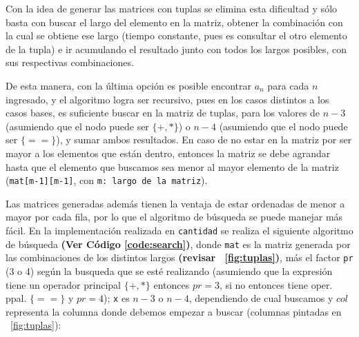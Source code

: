 \documentclass[letterpaper,10pt,table, dvipsnames]{article}
\newcommand{\figref}[1]{\figurename~\ref{#1}}
\begin{document}
\begin{enumerate}
\begin{table}[htbp]
\begin{minipage}[h]{0.8\linewidth}
\label{fig:matcombi4}
\end{minipage}
\end{table}

Con la idea de generar las matrices con tuplas se elimina esta dificultad y sólo basta con buscar el largo del elemento en la matriz, obtener la combinación con la cual se obtiene ese largo (tiempo constante, pues es consultar el otro elemento de la tupla) e ir acumulando el resultado junto con todos los largos posibles, con sus respectivas combinaciones. 
\end{enumerate}

De esta manera, con la última opción es posible encontrar $a_n$ para cada $n$ ingresado, y el algoritmo logra ser recursivo, pues en los casos distintos a los casos bases, es suficiente buscar en la matriz de tuplas, para los valores de $n-3$ (asumiendo que el nodo puede ser $\{+,*\}$) o $n-4$ (asumiendo que el nodo puede ser $\{==\}$), y sumar ambos resultados. En caso de no estar en la matriz por ser mayor a los elementos que están dentro, entonces la matriz se debe agrandar hasta que el elemento que buscamos sea menor al mayor elemento de la matriz (\texttt{mat[m-1][m-1]}, con \texttt{m: largo de la matriz}). 

Las matrices generadas además tienen la ventaja de estar ordenadas de menor a mayor por cada fila, por lo que el algoritmo de búsqueda se puede manejar más fácil. En la implementación realizada en \texttt{cantidad} se realiza el siguiente algoritmo de búsqueda \textbf{(Ver Código \ref{code:search})}, donde \texttt{mat} es la matriz generada por las combinaciones de los distintos largos \textbf{(revisar \figref{fig:tuplas})}, más el factor \texttt{pr} (3 o 4) según la busqueda que se esté realizando (asumiendo que la expresión tiene un operador principal $\{+,*\}$ entonces $pr=3$, si no entonces tiene oper. ppal. $\{==\}$ y $pr=4$); \texttt{x} es $n-3$ o $n-4$, dependiendo de cual buscamos y $col$ representa la columna donde debemos empezar a buscar (columnas pintadas en \figref{fig:tuplas}):
\end{document}
